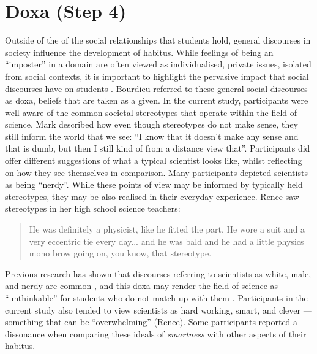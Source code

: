 \section{Doxa (Step 4)}
Outside of the of the social relationships that students hold, general discourses in society influence the development of habitus. 
While feelings of being an ``imposter'' in a domain are often viewed as individualised, private issues, isolated from social contexts, it is important to highlight the pervasive impact that social discourses have on students  \citep{breeze2018imposter}. Bourdieu referred to these general social discourses as doxa, beliefs that are taken as a given. In the current study, participants were well aware of the common societal stereotypes that operate within the field of science. Mark described how even though stereotypes do not make sense, they still inform the world that we see: ``I know that it doesn't make any sense and that is dumb, but then I still kind of from a distance view that''. Participants did offer different suggestions of what a typical scientist looks like, whilst reflecting on how they see themselves in comparison. Many participants depicted scientists as being ``nerdy''. While these points of view may be informed by typically held stereotypes, they may be also realised in their everyday experience. Renee saw stereotypes in her high school science teachers: \blockquote{He was definitely a physicist, like he fitted the part. He wore a suit and a very eccentric tie every day... and he was bald and he had a little physics mono brow going on, you know, that stereotype.} Previous research has shown that discourses referring to scientists as white, male, and nerdy are common \cite{Nosek_2009}, and this doxa may render the field of science as ``unthinkable'' for students who do not match up with them \cite{Archer_2013}. Participants in the current study also tended to view scientists as hard working, smart, and clever --- something that can be ``overwhelming'' (Renee).  Some participants reported a dissonance when comparing these ideals of \textit{smartness} with other aspects of their habitus.

